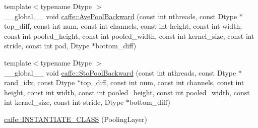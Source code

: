 \begin{DoxyCompactItemize}
\item 
{\footnotesize template$<$typename Dtype $>$ }\\\+\_\+\+\_\+global\+\_\+\+\_\+ void \hyperlink{namespacecaffe_a646a1381b87e6f26e1535cfe0c11283d}{caffe\+::\+Ave\+Pool\+Backward} (const int nthreads, const Dtype $\ast$top\+\_\+diff, const int num, const int channels, const int height, const int width, const int pooled\+\_\+height, const int pooled\+\_\+width, const int kernel\+\_\+size, const int stride, const int pad, Dtype $\ast$bottom\+\_\+diff)
\item 
{\footnotesize template$<$typename Dtype $>$ }\\\+\_\+\+\_\+global\+\_\+\+\_\+ void \hyperlink{namespacecaffe_a28ecc3c20dad2a7c95e8432f30ba30ae}{caffe\+::\+Sto\+Pool\+Backward} (const int nthreads, const Dtype $\ast$rand\+\_\+idx, const Dtype $\ast$top\+\_\+diff, const int num, const int channels, const int height, const int width, const int pooled\+\_\+height, const int pooled\+\_\+width, const int kernel\+\_\+size, const int stride, Dtype $\ast$bottom\+\_\+diff)
\item 
\hyperlink{namespacecaffe_af43ea480985566d99aa40bf8d862830a}{caffe\+::\+I\+N\+S\+T\+A\+N\+T\+I\+A\+T\+E\+\_\+\+C\+L\+A\+S\+S} (Pooling\+Layer)
\end{DoxyCompactItemize}
